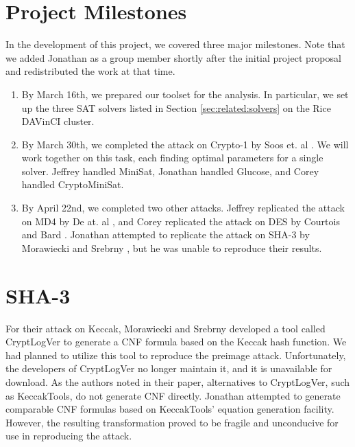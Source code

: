 \appendix
\section{Project Milestones}
\label{sec:milestones}

In the development of this project, we covered three major milestones. Note that we added Jonathan as a group member shortly after the initial project proposal and redistributed the work at that time.
\begin{enumerate}
	\item By March 16th, we prepared our toolset for the analysis. In particular, we set up the three SAT solvers listed in Section \ref{sec:related:solvers} on the Rice DAVinCI cluster.
	
	\item By March 30th, we completed the attack on Crypto-1 by Soos et. al \cite{SNC09}. We will work together on this task, each finding optimal parameters for a single solver. Jeffrey handled MiniSat, Jonathan handled Glucose, and Corey handled CryptoMiniSat.
	
	\item By April 22nd, we completed two other attacks. Jeffrey replicated the attack on MD4 by De at. al \cite{DKV07}, and Corey replicated the attack on DES by Courtois and Bard \cite{CB07}. Jonathan attempted to replicate the attack on SHA-3 by Morawiecki and Srebrny \cite{MS13}, but he was unable to reproduce their results.
\end{enumerate}

\section{SHA-3}
For their attack on Keccak, Morawiecki and Srebrny developed a tool called CryptLogVer to generate a CNF formula based on the Keccak hash function. We had planned to utilize this tool to reproduce the preimage attack. Unfortunately, the developers of CryptLogVer no longer maintain it, and it is unavailable for download. As the authors noted in their paper, alternatives to CryptLogVer, such as KeccakTools, do not generate CNF directly. Jonathan attempted to generate comparable CNF formulas based on KeccakTools' equation generation facility. However, the resulting transformation proved to be fragile and unconducive for use in reproducing the attack.
